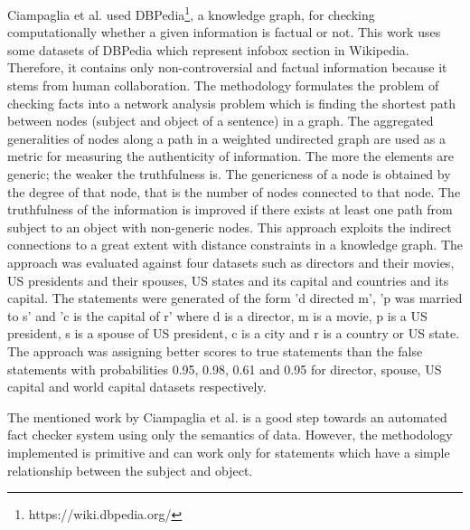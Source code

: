 \documentclass[a4paper, 11pt]{article}
\begin{document}
Ciampaglia et al. \cite{Ciampaglia2015} used DBPedia\footnote{https://wiki.dbpedia.org/}, a knowledge graph, for checking computationally whether a given information is factual or not. This work uses some datasets of DBPedia which represent infobox section in Wikipedia. Therefore, it contains only non-controversial and factual information because it stems from human collaboration. The methodology formulates the problem of checking facts into a network analysis problem which is finding the shortest path between nodes (subject and object of a sentence) in a graph. The aggregated generalities of nodes along a path in a weighted undirected graph are used as a metric for measuring the authenticity of information. The more the elements are generic; the weaker the truthfulness is.  The genericness of a node is obtained by the degree of that node, that is the number of nodes connected to that node. The truthfulness of the information is improved if there exists at least one path from subject to an object with non-generic nodes. This approach exploits the indirect connections to a great extent with distance constraints in a knowledge graph. The approach was evaluated against four datasets such as directors and their movies, US presidents and their spouses, US states and its capital and countries and its capital. The statements were generated of the form 'd directed m', 'p was married to s' and 'c is the capital of r' where d is a director, m is a movie, p is a US president, s is a spouse of US president, c is a city and r is a country or US state. The approach was assigning better scores to true statements than the false statements with probabilities 0.95, 0.98, 0.61 and 0.95 for director, spouse, US capital and world capital datasets respectively.

The mentioned work by Ciampaglia et al. is a good step towards an automated fact checker system using only the semantics of data. However, the methodology implemented is primitive and can work only for statements which have a simple relationship between the subject and object.





\end{document}
